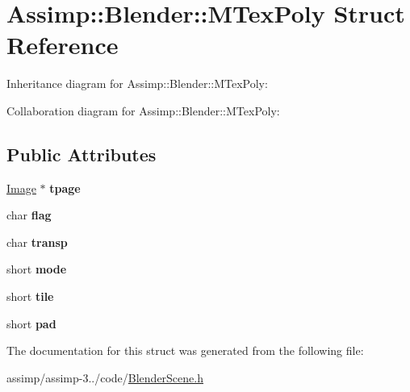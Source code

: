 \hypertarget{struct_assimp_1_1_blender_1_1_m_tex_poly}{\section{Assimp\+:\+:Blender\+:\+:M\+Tex\+Poly Struct Reference}
\label{struct_assimp_1_1_blender_1_1_m_tex_poly}
}


Inheritance diagram for Assimp\+:\+:Blender\+:\+:M\+Tex\+Poly\+:


Collaboration diagram for Assimp\+:\+:Blender\+:\+:M\+Tex\+Poly\+:
\subsection*{Public Attributes}
\begin{DoxyCompactItemize}
\item 
\hypertarget{struct_assimp_1_1_blender_1_1_m_tex_poly_a07bd4c5a28ab64ed924c5c447759de47}{\hyperlink{struct_assimp_1_1_blender_1_1_image}{Image} $\ast$ {\bfseries tpage}}\label{struct_assimp_1_1_blender_1_1_m_tex_poly_a07bd4c5a28ab64ed924c5c447759de47}

\item 
\hypertarget{struct_assimp_1_1_blender_1_1_m_tex_poly_afab7e7c1f9cc649660df75327833baa2}{char {\bfseries flag}}\label{struct_assimp_1_1_blender_1_1_m_tex_poly_afab7e7c1f9cc649660df75327833baa2}

\item 
\hypertarget{struct_assimp_1_1_blender_1_1_m_tex_poly_a0d179211d989a1b6563b23f32921a258}{char {\bfseries transp}}\label{struct_assimp_1_1_blender_1_1_m_tex_poly_a0d179211d989a1b6563b23f32921a258}

\item 
\hypertarget{struct_assimp_1_1_blender_1_1_m_tex_poly_af0247e8832f4ca7e32ffe5e4891a0225}{short {\bfseries mode}}\label{struct_assimp_1_1_blender_1_1_m_tex_poly_af0247e8832f4ca7e32ffe5e4891a0225}

\item 
\hypertarget{struct_assimp_1_1_blender_1_1_m_tex_poly_ac2faac7a1a553e956e79d5c2adfb33d7}{short {\bfseries tile}}\label{struct_assimp_1_1_blender_1_1_m_tex_poly_ac2faac7a1a553e956e79d5c2adfb33d7}

\item 
\hypertarget{struct_assimp_1_1_blender_1_1_m_tex_poly_a07d49dcec74d0762c47ee41aa26ce636}{short {\bfseries pad}}\label{struct_assimp_1_1_blender_1_1_m_tex_poly_a07d49dcec74d0762c47ee41aa26ce636}

\end{DoxyCompactItemize}


The documentation for this struct was generated from the following file\+:\begin{DoxyCompactItemize}
\item 
assimp/assimp-\/3../code/\hyperlink{_blender_scene_8h}{Blender\+Scene.\+h}\end{DoxyCompactItemize}
